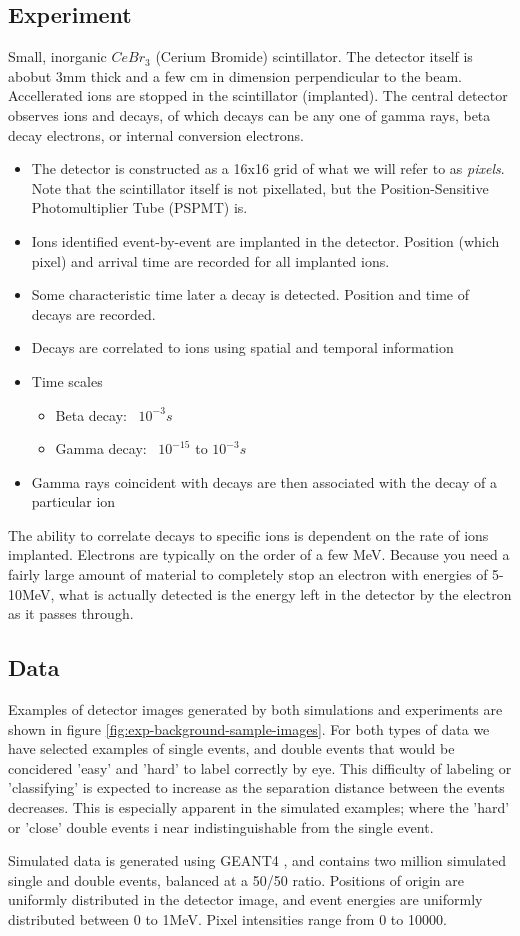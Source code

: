 \subsection{Experiment}
Small, inorganic $CeBr_3$ (Cerium Bromide) scintillator. The detector itself is abobut 3mm
thick and a few cm in dimension perpendicular to the beam. Accellerated ions are stopped
in the scintillator (implanted). The central detector observes ions and decays, of which decays can
be any one of gamma rays, beta decay electrons, or internal conversion electrons.
\begin{itemize}
	\item The detector is constructed as a 16x16 grid of what we will refer to as
	\textit{pixels}. Note that the scintillator itself is not pixellated, but the
	Position-Sensitive Photomultiplier Tube (PSPMT) is.
	\item Ions identified event-by-event are implanted in the detector.
	Position (which pixel) and arrival time are recorded for all implanted ions.
	\item Some characteristic time later a decay is detected. Position and time of decays
	are recorded.
	\item Decays are correlated to ions using spatial and temporal information
	\item Time scales
	\begin{itemize}
		\item Beta decay: ~$10^{-3}s$
		\item Gamma decay: ~$10^{-15}$ to $10^{-3}s$
	\end{itemize}
	\item Gamma rays coincident with decays are then associated with the decay of a
	particular ion
\end{itemize}
The ability to correlate decays to specific ions is dependent on the rate of ions 
implanted. Electrons are typically on the order of a few MeV. Because you need a 
fairly large amount of material to completely stop an electron with energies of 5-10MeV,
what is actually detected is the energy left in the detector by the electron as it 
passes through.

\subsection{Data}
Examples of detector images generated by both simulations and experiments
are shown in figure \ref{fig:exp-background-sample-images}. For both types
of data we have selected examples of single events, and double events that
would be concidered 'easy' and 'hard' to label correctly by eye. This difficulty
of labeling or 'classifying' is expected to increase as the separation distance
between the events decreases. This is especially apparent in the simulated
examples; where the 'hard' or 'close' double events i near indistinguishable
from the single event. 

Simulated data is generated using GEANT4 \cite{Agostinelli2003}, and contains
two million simulated single and double events, balanced at a 50/50 ratio. 
Positions of origin are uniformly distributed in the detector image, and 
event energies are uniformly distributed between 0 to 1MeV. Pixel intensities 
range from 0 to 10000.

